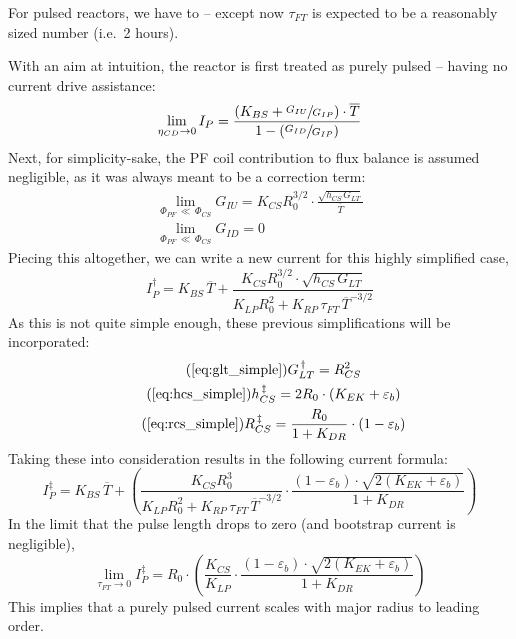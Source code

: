 For pulsed reactors, we have to  -- except now $\tau_{FT}$ is expected to be a reasonably sized number (i.e.\ 2 hours).

With an aim at intuition, the reactor is first treated as purely pulsed -- having no current drive assistance:
\begin{equation}
	\lim_{\eta_{CD} \to 0} I_P = \frac{ \left( K_{BS} + \sfrac{ G_{IU} }{ G_{IP} } \right) \cdot \overline T }{ 1 - \left( \sfrac{ G_{ID} }{ G_{IP} } \right) }
\end{equation}
Next, for simplicity-sake, the PF coil contribution to flux balance is assumed negligible, as it was always meant to be a correction term:
\begin{gather}
	\lim_{ \Phi_{PF} \, \ll \, \Phi_{CS} } G_{IU} = K_{CS} R_0^{3/2} \cdot \frac{ \sqrt{ h_{CS} \, G_{LT} } }{ \overline T } \\
	\lim_{ \Phi_{PF} \, \ll \, \Phi_{CS} } G_{ID} = 0
\end{gather}
Piecing this altogether, we can write a new current for this highly simplified case,
\begin{equation}
	I_P^\dagger = K_{BS} \, \overline T + \frac{ K_{CS} R_0^{3/2} \cdot \sqrt{ h_{CS} \, G_{LT} } }{ K_{LP} R_0^2 + K_{RP} \, \tau_{FT} \, \overline T ^ {-3/2} }
\end{equation}
As this is not quite simple enough, these previous simplifications will be incorporated:
\begin{gather}
	\tag{\ref{eq:glt_simple}}
	G_{LT}^{\,\dagger} = R_{CS}^2 \\
	\tag{\ref{eq:hcs_simple}}
	h_{CS}^{\,\ddagger} = 2 R_0 \cdot \left( K_{EK} + \varepsilon_b \right) \\
	\tag{\ref{eq:rcs_simple}}
	R_{CS}^{\,\ddagger} = \frac{ R_0 }{ 1 + K_{DR} } \cdot \left( 1 - \varepsilon_b  \right)
\end{gather}
Taking these into consideration results in the following current formula:
\begin{equation}
	I_P^\ddagger = K_{BS} \, \overline T + \left( \frac{ K_{CS} R_0^3 }{ K_{LP} R_0^2 + K_{RP} \, \tau_{FT} \, \overline T ^ {-3/2} } \cdot \frac{ ( 1 - \varepsilon_b ) \cdot \sqrt{ 2 ( K_{EK} + \varepsilon_b ) } }{ 1 + K_{DR} } \right)
\end{equation}
In the limit that the pulse length drops to zero (and bootstrap current is negligible),
\begin{equation}
	\label{eq:tau_zero}
	\lim_{ \tau_{FT} \to 0 } I_P^\ddagger = R_0 \cdot \left( \frac{ K_{CS} }{ K_{LP} } \cdot \frac{ ( 1 - \varepsilon_b ) \cdot \sqrt{ 2 ( K_{EK} + \varepsilon_b ) } }{ 1 + K_{DR} } \right)
\end{equation}
This implies that a purely pulsed current scales with major radius to leading order.

